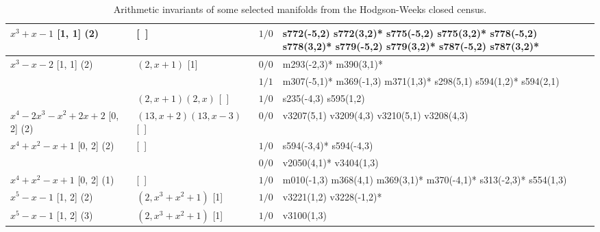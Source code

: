 \documentclass[a4paper]{amsart}
\newcommand{\PreserveBackslash}[1]{\let\temp =\\#1\let\\=\temp}
\theoremstyle{definition}
\begin{document}
\begin{table}[p]
\begin{tabular}{|>{\PreserveBackslash\raggedright}p{3.5cm}
	|>{\PreserveBackslash\raggedright}p{3.5cm}|l %
	|>{\PreserveBackslash\raggedright}p{5cm}|}
\hline

\hbox{$x^3 + x - 1$} [1, 1] (2) &
[~] &
$1/0$ &
{s772(-5,2) s772(3,2)* s775(-5,2) s775(3,2)* s778(-5,2) s778(3,2)* s779(-5,2) s779(3,2)* s787(-5,2) s787(3,2)*} \\

\hline

\hbox{$x^3 - x - 2$} [1, 1] (2) &
\hbox{$(2, x + 1)$} [1]&
$0/0$ &
{m293(-2,3)* m390(3,1)*} \\

\cline{3-4}

& %
& %
$1/1$ &
{m307(-5,1)* m369(-1,3) m371(1,3)* s298(5,1) s594(1,2)* s594(2,1)} \\

\cline{2-4}

& %
\hbox{$(2, x + 1) (2, x)$} [~]&
$1/0$ &
{s235(-4,3) s595(1,2)} \\

\hline

\hbox{$x^4 - 2x^3 - x^2 + 2x + 2$} [0, 2] (2) &
\hbox{$(13, x + 2) (13, x - 3)$} [~]&
$0/0$ &
{v3207(5,1) v3209(4,3) v3210(5,1) v3208(4,3)} \\

\hline

\hbox{$x^4 + x^2 - x + 1$} [0, 2] (2) &
[~] &
$1/0$ &
{s594(-3,4)* s594(-4,3) } \\ 

\cline{3-4}

& %
& %
$0/0$ &
{v2050(4,1)* v3404(1,3)} \\

\hline

\hbox{$x^4 + x^2 - x + 1$} [0, 2] (1) &
[~] &
$1/0$ &
{m010(-1,3) m368(4,1) m369(3,1)* m370(-4,1)* s313(-2,3)* s554(1,3)} \\

\hline

\hbox{$x^5 - x - 1$} [1, 2] (2) &
\hbox{$(2, x^3 + x^2 + 1)$} [1]&
$1/0$ &
{v3221(1,2) v3228(-1,2)*} \\

\hline

\hbox{$x^5 - x - 1$} [1, 2] (3) &
\hbox{$(2, x^3 + x^2 + 1)$} [1]&
$1/0$ &
{v3100(1,3)} \\

\hline

\end{tabular}
\caption{Arithmetic invariants of some selected manifolds from the Hodgson-Weeks
closed census.}
\label{algebras}
\end{table}
\end{document}

